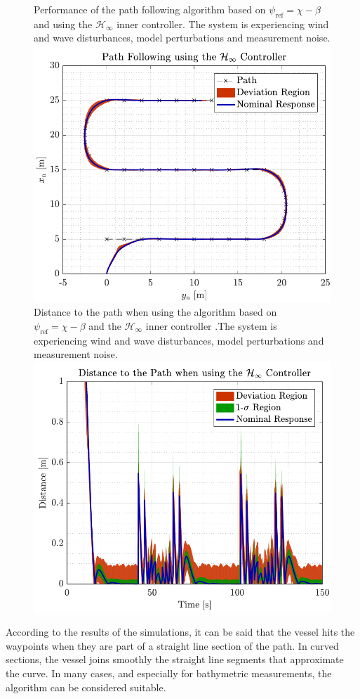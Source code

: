 \begin{figure}[H]
	\captionbox 
	{   
		Performance of the path following algorithm based on $\psi_\mathrm{ref}=\chi-\beta$ and using the $\mathcal{H}_\infty$ inner controller. The system is experiencing wind and wave disturbances, model perturbations and measurement noise. \label{fig:robustcorrect}
	}                                                                 
	{                                                                  
		\includegraphics[width=.45\textwidth]{figures/path_rob}         
	}                                                                    
	\hspace{5pt}                                                          
	\captionbox  
	{      
			Distance to the path when using the algorithm based on $\psi_\mathrm{ref}=\chi-\beta$ and the $\mathcal{H}_\infty$ inner controller .The system is experiencing wind and wave disturbances, model perturbations and measurement noise.\label{fig:distrobustcorrect}
	}                                                                          
	{
		\includegraphics[width=.45\textwidth]{figures/dist_rob}
	}
\end{figure}
According to the results of the simulations, it can be said that the vessel hits the waypoints when they are part of a straight line section of the path. In curved sections, the vessel joins smoothly the straight line segments that approximate the curve. In many cases, and especially for bathymetric measurements, the algorithm can be considered suitable.